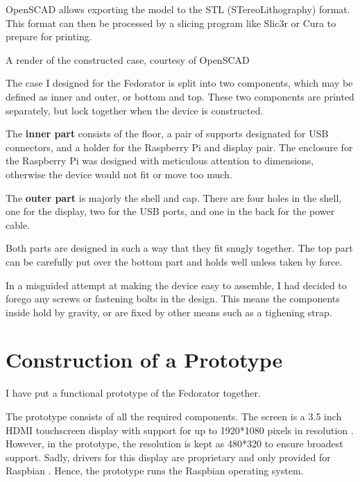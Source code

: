         OpenSCAD allows exporting the model to the STL (STereoLithography) format.  This format can then be processed by a slicing program like Slic3r or Cura to prepare for printing.
        
            {A render of the constructed case, courtesy of OpenSCAD}
        
        The case I designed for the Fedorator is split into two components, which may be defined as inner and outer, or bottom and top.  These two components are printed separately, but lock together when the device is constructed.
        
        The \textbf{inner part} consists of the floor, a pair of supports designated for USB connectors, and a holder for the Raspberry Pi and display pair.  The enclosure for the Raspberry Pi was designed with meticulous attention to dimensions, otherwise the device would not fit or move too much.
        
        The \textbf{outer part} is majorly the shell and cap.  There are four holes in the shell, one for the display, two for the USB ports, and one in the back for the power cable.
        
        Both parts are designed in such a way that they fit snugly together.  The top part can be carefully put over the bottom part and holds well unless taken by force.
        
        In a misguided attempt at making the device easy to assemble, I had decided to forego any screws or fastening bolts in the design.  This means the components inside hold by gravity, or are fixed by other means such as a tighening strap.
        
        
    \section{Construction of a Prototype}
        I have put a functional prototype of the Fedorator together.
        
        The prototype consists of all the required components.  The screen is a 3.5 inch HDMI touchscreen display with support for up to 1920*1080 pixels in resolution \cite{aliexpress-touchscreen}.  However, in the prototype, the resolution is kept as 480*320 to ensure broadest support.  Sadly, drivers for this display are proprietary and only provided for Raspbian \cite{osoyoo-drivers}.  Hence, the prototype runs the Raspbian operating system.
        
